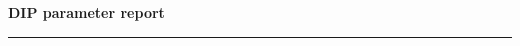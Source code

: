 \documentclass{article}
\begin{document}
{\Large\bfseries\textcolor{sntBlue}{DIP parameter report}\par}
\vspace{0.25em}\hrule\vspace{0.5em}
\end{document}
